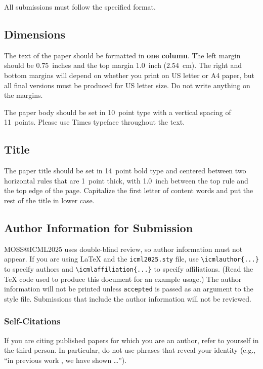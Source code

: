 \documentclass{article}
\theoremstyle{plain}
\theoremstyle{definition}
\theoremstyle{remark}
\begin{document}
All submissions must follow the specified format.

\subsection{Dimensions}




The text of the paper should be formatted in \textbf{one column}. The left margin should be 0.75~inches and the top
margin 1.0~inch (2.54~cm). The right and bottom margins will depend on
whether you print on US letter or A4 paper, but all final versions
must be produced for US letter size.
Do not write anything on the margins.

The paper body should be set in 10~point type with a vertical spacing
of 11~points. Please use Times typeface throughout the text.

\subsection{Title}

The paper title should be set in 14~point bold type and centered
between two horizontal rules that are 1~point thick, with 1.0~inch
between the top rule and the top edge of the page. Capitalize the
first letter of content words and put the rest of the title in lower
case.

\subsection{Author Information for Submission}
\label{author info}

MOSS@ICML2025 uses double-blind review, so author information must not appear. If
you are using \LaTeX\/ and the \texttt{icml2025.sty} file, use
\verb+\icmlauthor{...}+ to specify authors and \verb+\icmlaffiliation{...}+ to specify affiliations. (Read the TeX code used to produce this document for an example usage.) The author information
will not be printed unless \texttt{accepted} is passed as an argument to the
style file.
Submissions that include the author information will not
be reviewed.

\subsubsection{Self-Citations}

If you are citing published papers for which you are an author, refer
to yourself in the third person. In particular, do not use phrases
that reveal your identity (e.g., ``in previous work \cite{langley00}, we
have shown \ldots'').
\end{document}
